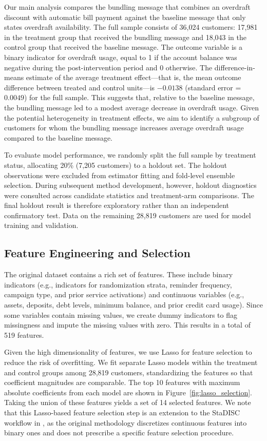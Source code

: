 \documentclass[12pt]{article}
\begin{document}
Our main analysis compares the bundling message that combines an overdraft discount with automatic bill payment against the baseline message that only states overdraft availability. The full sample consists of 36,024 customers: 17,981 in the treatment group that received the bundling message and 18,043 in the control group that received the baseline message. The outcome variable is a binary indicator for overdraft usage, equal to 1 if the account balance was negative during the post-intervention period and 0 otherwise. The difference-in-means estimate of the average treatment effect---that is, the mean outcome difference between treated and control units---is $-0.0138$ (standard error = $0.0049$) for the full sample. This suggests that, relative to the baseline message, the bundling message led to a modest average decrease in overdraft usage. Given the potential heterogeneity in treatment effects, we aim to identify a subgroup of customers for whom the bundling message increases average overdraft usage compared to the baseline message.

To evaluate model performance, we randomly split the full sample by treatment status, allocating 20{\%} (7,205 customers) to a holdout set. The holdout observations were excluded from estimator fitting and fold-level ensemble selection. During subsequent method development, however, holdout diagnostics were consulted across candidate statistics and treatment-arm comparisons. The final holdout result is therefore exploratory rather than an independent confirmatory test. Data on the remaining 28,819 customers are used for model training and validation.

\subsection{Feature Engineering and Selection}

The original dataset contains a rich set of features. These include binary indicators (e.g., indicators for randomization strata, reminder frequency, campaign type, and prior service activations) and continuous variables (e.g., assets, deposits, debt levels, minimum balance, and prior credit card usage). Since some variables contain missing values, we create dummy indicators to flag missingness and impute the missing values with zero. This results in a total of 519 features.

Given the high dimensionality of features, we use Lasso for feature selection to reduce the risk of overfitting. We fit separate Lasso models within the treatment and control groups among 28,819 customers, standardizing the features so that coefficient magnitudes are comparable. The top 10 features with maximum absolute coefficients from each model are shown in Figure~\ref{fig:lasso_selection}. Taking the union of these features yields a set of 14 selected features. We note that this Lasso-based feature selection step is an extension to the StaDISC workflow in \cite{dwivedi2020}, as the original methodology discretizes continuous features into binary ones and does not prescribe a specific feature selection procedure.
\end{document}
